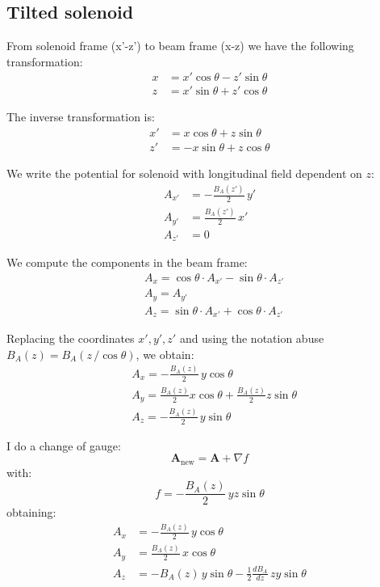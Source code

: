 \subsection{Tilted solenoid}

From solenoid frame (x'-z') to beam frame (x-z) we have the following transformation:
\begin{align}
x &= x' \cos\theta - z' \sin\theta \\
z &= x' \sin\theta + z' \cos\theta
\end{align}

The inverse transformation is:
\begin{align}
x' &= x \cos\theta + z \sin\theta \\
z' &= -x \sin\theta + z \cos\theta
\end{align}

We write the potential for solenoid with longitudinal field dependent on $z$:
\begin{align}
A_{x'} &= -\frac{B_A(z')}{2} \, y' \\
A_{y'} &= \frac{B_A(z')}{2} \, x' \\
A_{z'} &= 0
\end{align}

We compute the components in the beam frame:
\begin{align}
&A_x = \cos\theta \cdot A_{x'} - \sin\theta \cdot A_{z'} \\
&A_y = A_{y'} \\
&A_z = \sin\theta \cdot A_{x'} + \cos\theta \cdot A_{z'}
\end{align}

Replacing the coordinates $x', y', z'$ and using the notation abuse
$B_A(z) = B_A(z\,/\cos \theta)$, we obtain:
\begin{align}
&A_x = -\frac{B_A(z)}{2} \, y \cos\theta \\
&A_y = \frac{B_A(z)}{2} x \cos\theta + \frac{B_A(z)}{2} z \sin\theta \\
&A_z = -\frac{B_A(z)}{2} \, y \sin\theta
\end{align}

I do a change of gauge:
\begin{equation}
\mathbf{A}_\text{new} = \mathbf{A} + \nabla f
\end{equation}
with:
\begin{equation}
f = -\frac{B_A(z)}{2} \, y z \sin\theta
\end{equation}
obtaining:
\begin{align}
A_x &= -\frac{B_A(z)}{2} \, y \cos\theta \\
A_y &= \frac{B_A(z)}{2} \, x \cos\theta \\
A_z &= -B_A(z) \, y \sin\theta - \frac{1}{2} \frac{dB_A}{dz} \, z y \sin\theta
\end{align}

